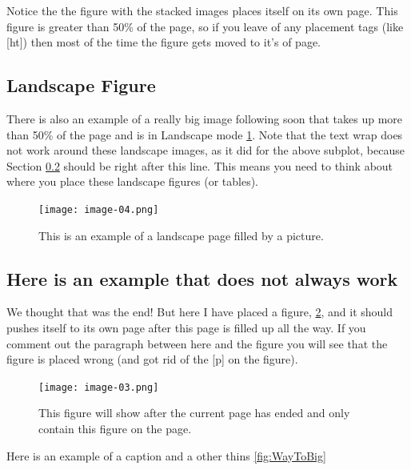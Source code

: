 Notice the the figure with the stacked images places itself on its own page. This figure is greater than 50\% of the page, so if you leave of any placement tags (like [ht]) then most of the time the figure gets moved to it's of page.

\subsection{Landscape Figure}
There is also an example of a really big image following soon that takes up more than 50\% of the page and is in Landscape mode \ref{fig:hallo}. Note that the text wrap does not work around these landscape images, as it did for the above subplot, because Section \ref{sec-Important} should be right after this line. This means you need to think about where you place these landscape figures (or tables).

\begin{landscape}
\centering
\begin{figure}[ht]
    \centering
    \texttt{[image: image-04.png]}
    \caption{This is an example of a landscape page filled by a picture.}
    \label{fig:hallo}
\end{figure}
\end{landscape}

\subsection{Here is an example that does not always work} \label{sec-Important}
We thought that was the end! But here I have placed a figure, \ref{fig:hallo2}, and it should pushes itself to its own page after this page is filled up all the way. If you comment out the paragraph between here and the figure you will see that the figure is placed wrong (and got rid of the [p] on the figure).

\lipsum[1]

\begin{figure}[p]
    \centering
    \texttt{[image: image-03.png]}
    \caption{This figure will show after the current page has ended and only contain this figure on the page. \cite{cite-xkcd_2016}}
    \label{fig:hallo2}
\end{figure}

\lipsum[2]

\lipsum[3]

\lipsum[1]

Here is an example of a caption and a other thins \ref{fig:WayToBig}

